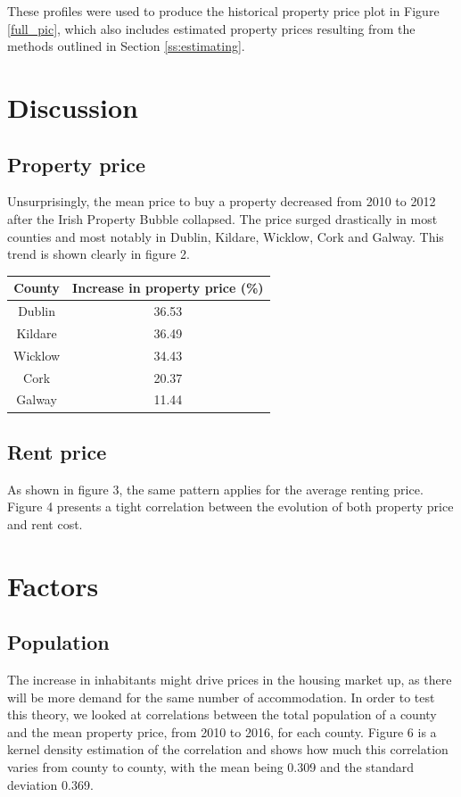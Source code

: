 \documentclass[twocolumn]{article}
\begin{document}
These profiles were used to produce the historical property price plot in
Figure \ref{full_pic}, which also includes estimated property prices
resulting from the methods outlined in Section \ref{ss:estimating}.

\section{Discussion\label{s:discuss}}

\subsection{Property price}
Unsurprisingly, the mean price to buy a property decreased from 2010 to 2012
after the Irish Property Bubble collapsed. The price surged drastically in most
counties and most notably in Dublin, Kildare, Wicklow, Cork and Galway. This
trend is shown clearly in figure 2. \begin{center}
\begin{tabular}{||c c||}
 \hline
 County & Increase in property price (\%) \\ [0.5ex]
 \hline\hline
 Dublin & 36.53 \\
 \hline
 Kildare & 36.49 \\
 \hline
 Wicklow & 34.43 \\
 \hline
 Cork & 20.37 \\
 \hline
 Galway & 11.44 \\ [1ex]
 \hline
\end{tabular}
\end{center}

\subsection{Rent price}
As shown in figure 3, the same pattern applies for the average renting price. Figure 4 presents a tight correlation between the evolution of both property price and rent cost.

\section{Factors}
\subsection{Population}
The increase in inhabitants might drive prices in the housing market up, as
there will be more demand for the same number of accommodation. In order to
test this theory, we looked at correlations between the total population of a
county and the mean property price, from 2010 to 2016, for each county. Figure
6 is a kernel density estimation of the correlation and shows how much this
correlation varies from county to county, with the mean being 0.309 and the
standard deviation 0.369.
\end{document}

